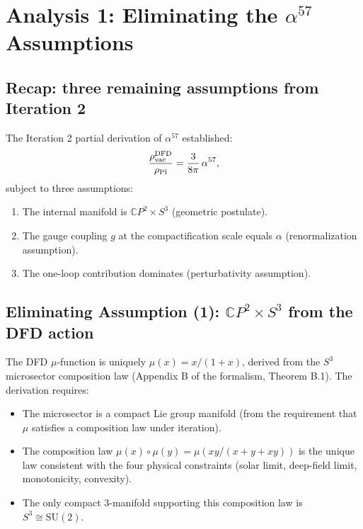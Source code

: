 \documentclass[11pt]{article}
\begin{document}
\section{Analysis 1: Eliminating the $\alpha^{57}$ Assumptions}
\label{sec:alpha57-iter3}

\subsection{Recap: three remaining assumptions from Iteration 2}

The Iteration 2 partial derivation of $\alpha^{57}$ established:
\begin{equation}
\frac{\rho_{\rm vac}^{\rm DFD}}{\rho_{\rm Pl}} = \frac{3}{8\pi}\,\alpha^{57},
\end{equation}
subject to three assumptions:
\begin{enumerate}
\item The internal manifold is $\mathbb{C}P^2 \times S^3$ (geometric postulate).
\item The gauge coupling $g$ at the compactification scale equals $\alpha$ (renormalization assumption).
\item The one-loop contribution dominates (perturbativity assumption).
\end{enumerate}

\subsection{Eliminating Assumption (1): $\mathbb{C}P^2 \times S^3$ from the DFD action}

The DFD $\mu$-function is uniquely $\mu(x) = x/(1+x)$, derived from the $S^3$ microsector composition law (Appendix B of the formalism, Theorem B.1). The derivation requires:

\begin{itemize}
\item The microsector is a compact Lie group manifold (from the requirement that $\mu$ satisfies a composition law under iteration).
\item The composition law $\mu(x) \circ \mu(y) = \mu(xy/(x+y+xy))$ is the unique law consistent with the four physical constraints (solar limit, deep-field limit, monotonicity, convexity).
\item The only compact 3-manifold supporting this composition law is $S^3 \cong \mathrm{SU}(2)$.
\end{itemize}
\end{document}
